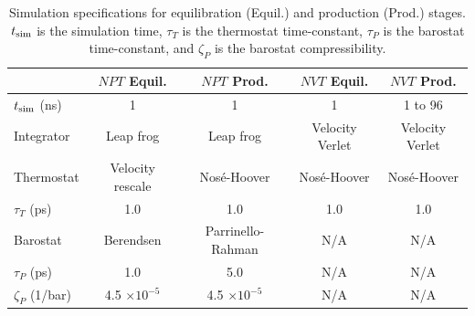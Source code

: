 \documentclass[preprint,review,12pt]{elsarticle}
\begin{document}

	\begin{table}[htbp!]
		\caption{Simulation specifications for equilibration (Equil.) and production (Prod.) stages. $t_{\rm sim}$ is the simulation time, $\tau_{T}$ is the thermostat time-constant, $\tau_{P}$ is the barostat time-constant, and $\zeta_{P}$ is the barostat compressibility.} \label{tab:thermostats_barostats}
		\begin{tabular}{|l|c|c|c|c|}
			\hline
			& $NPT$ Equil. & $NPT$ Prod. & $NVT$ Equil. & $NVT$ Prod. \\ \hline
			$t_{\rm sim}$ (ns) & 1 & 1 & 1 & 1 to 96 \\ \hline
			Integrator & Leap frog \cite{Hockney1974} & Leap frog & Velocity Verlet \cite{Swope1982} & Velocity Verlet \\ \hline 
			Thermostat & Velocity rescale \cite{Bussi2007} & Nos{\'e}-Hoover \cite{Hoover1985,Nose1984} & Nos{\'e}-Hoover & Nos{\'e}-Hoover \\ \hline 
			$\tau_{T}$ (ps) & 1.0 & 1.0 & 1.0 & 1.0 \\ \hline
			Barostat & Berendsen \cite{Berendsen1984} & Parrinello-Rahman \cite{Nose1983,Parrinello1981} & N/A & N/A \\ \hline
			$\tau_{P}$ (ps) & 1.0 & 5.0 & N/A & N/A \\ \hline
			$\zeta_{P}$ (1/bar) & 4.5 $\times 10^{-5}$ & 4.5 $\times 10^{-5}$ & N/A & N/A \\
			\hline
		\end{tabular}
	\end{table}
\end{document}
